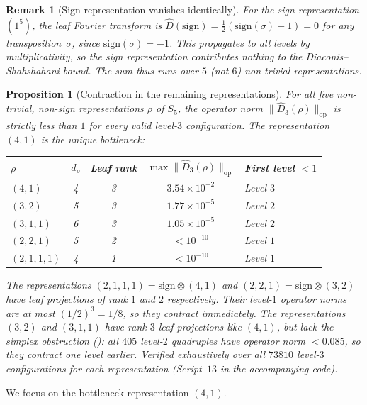 \documentclass[11pt]{article}
\newtheorem{proposition}[theorem]{Proposition}
\newtheorem{remark}[theorem]{Remark}
\newcommand{\norm}[1]{\lVert #1 \rVert}
\newcommand{\opn}[1]{\norm{#1}_{\mathrm{op}}}
\newcommand{\Dhat}{\widehat{D}}
\begin{document}
\begin{remark}[Sign representation vanishes identically]
\label{rem:sign}
For the sign representation $(1^5)$, the leaf Fourier transform is
$\Dhat(\mathrm{sign}) = \frac{1}{2}(\mathrm{sign}(\sigma) + 1) = 0$
for any transposition~$\sigma$, since $\mathrm{sign}(\sigma) = -1$.
This propagates to all levels by multiplicativity, so the sign
representation contributes nothing to the Diaconis--Shahshahani bound.
The sum thus runs over $5$ (not $6$) non-trivial representations.
\end{remark}

\begin{proposition}[Contraction in the remaining representations]
\label{prop:other_reps}
For all five non-trivial, non-sign representations $\rho$ of $S_5$, the
operator norm $\opn{\Dhat_3(\rho)}$ is strictly less than $1$ for every
valid level-$3$ configuration. The representation $(4,1)$ is the unique
bottleneck:
\begin{center}
\begin{tabular}{lcccl}
\toprule
$\rho$ & $d_\rho$ & Leaf rank & $\max\opn{\Dhat_3(\rho)}$ & First level $< 1$ \\
\midrule
$(4,1)$     & 4 & 3 & $3.54 \times 10^{-2}$ & Level $3$ \\
$(3,2)$     & 5 & 3 & $1.77 \times 10^{-5}$ & Level $2$ \\
$(3,1,1)$   & 6 & 3 & $1.05 \times 10^{-5}$ & Level $2$ \\
$(2,2,1)$   & 5 & 2 & $< 10^{-10}$          & Level $1$ \\
$(2,1,1,1)$ & 4 & 1 & $< 10^{-10}$          & Level $1$ \\
\bottomrule
\end{tabular}
\end{center}
The representations $(2,1,1,1) = \mathrm{sign} \otimes (4,1)$ and
$(2,2,1) = \mathrm{sign} \otimes (3,2)$ have leaf projections of rank $1$
and $2$ respectively. Their level-$1$ operator norms are at most $(1/2)^3 = 1/8$,
so they contract immediately. The representations $(3,2)$ and $(3,1,1)$
have rank-$3$ leaf projections like $(4,1)$, but lack the simplex
obstruction (): all $405$ level-$2$ quadruples have
operator norm $< 0.085$, so they contract one level earlier.
\emph{Verified exhaustively over all $73810$ level-$3$ configurations
for each representation} (Script~$13$ in the accompanying code).
\end{proposition}

We focus on the bottleneck representation $(4,1)$.
\end{document}
